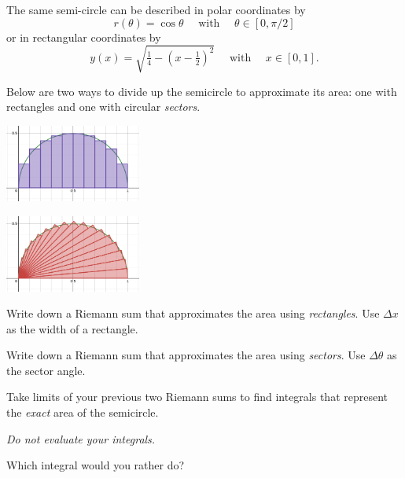 \documentclass{workbook}
\begin{document}
\begin{slide}
	\question
		The same semi-circle can be described in polar coordinates by
		\[
r(\theta)=\cos\theta\quad\text{ with }\quad\theta\in[0,\pi/2]
		\]
		 or in rectangular
		coordinates by \[
		y(x)=\sqrt{\tfrac{1}{4}-\left(x-\tfrac{1}{2}\right)^2}\quad\text{ with }\quad x\in[0,1].
		\]

		Below are two ways to divide up the semicircle to approximate its area: one with rectangles and one with circular \emph{sectors}.
		\begin{center}
	\includegraphics[height=1in]{images/riemann-rect.png}
		\end{center}
		\begin{center}
	\includegraphics[height=1in]{images/riemann-polar.png}
		\end{center}

	
	\begin{parts}
		\item Write down a Riemann sum that approximates the area using 
		\emph{rectangles}. Use $\Delta x$ as the width of a rectangle.

		\item Write down a Riemann sum that approximates the area using 
		\emph{sectors}. Use $\Delta \theta$ as the sector angle.
		
		\item Take limits of your previous two Riemann sums to find 
		integrals that represent the \emph{exact} area of the semicircle. 

		\emph{Do not evaluate your integrals.}

		\item Which integral would you rather do?
	\end{parts}
\end{slide}
\end{document}
